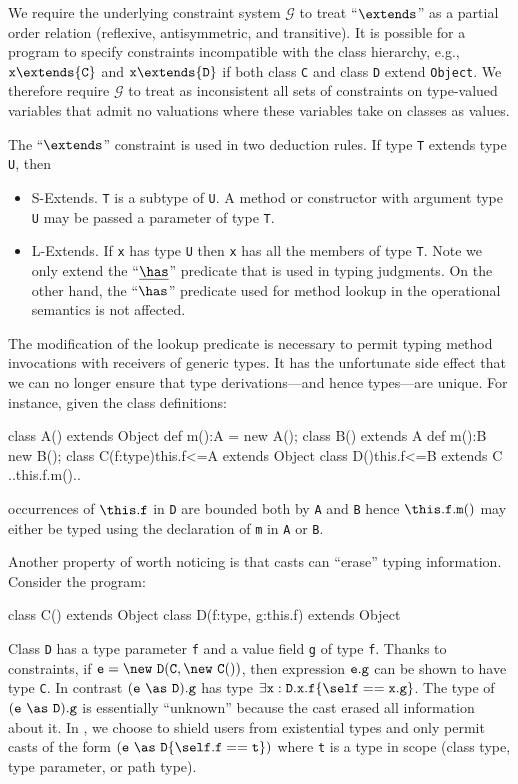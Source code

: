 We require the underlying constraint system $\mathcal{G}$ to treat ``$\extends$'' as a partial order relation (reflexive, antisymmetric, and transitive). It is possible for a program to specify constraints incompatible with the class hierarchy, e.g., ${\tt x}\extends{\tt C}$ and ${\tt x}\extends{\tt D}$ if both class {\tt C} and class {\tt D} extend {\tt Object}. We therefore require $\mathcal{G}$ to treat as inconsistent all sets of constraints on type-valued variables that admit no valuations where these variables take on classes as values.

The ``$\extends$'' constraint is used in two deduction rules. If
type {\tt T} extends type {\tt U}, then
\begin{itemize}
\item{\sc S-Extends}. {\tt T} is a subtype of {\tt U}. A method or constructor with argument type {\tt U} may be passed a parameter of type {\tt T}.
\item{\sc L-Extends}. If {\tt x} has type {\tt U} then {\tt x} has all the members of type {\tt T}. Note we only extend the ``$\underline\has$'' predicate that is used in typing judgments. On the other hand, the ``$\has$'' predicate used for method lookup in the operational semantics is not affected.
\end{itemize}

The modification of the lookup predicate is
necessary to permit typing method invocations with receivers of
generic types. It has the unfortunate side effect that we can no
longer ensure that type derivations---and hence types---are unique.
For instance, given the class definitions:
%
\begin{xten}
class A() extends Object { def m():A = new A(); }
class B() extends A { def m():B new B(); }
class C(f:type){this.f<=A} extends Object {}
class D(){this.f<=B} extends C { ..this.f.m().. }
\end{xten}
%
occurrences of $\this.{\tt f}$ in {\tt D} are bounded both by {\tt A} and {\tt B} hence 
$\this.{\tt f}.{\tt m}()$ may either be typed using the declaration of {\tt m} in {\tt A} or {\tt B}.

Another property of \FXG{} worth noticing is that casts can ``erase'' typing information.
Consider the program:
\begin{xten}
class C() extends Object {}
class D(f:type, g:this.f) extends Object {}
\end{xten}
Class {\tt D} has a type parameter {\tt f} and a value field {\tt g} of type {\tt f}.
Thanks to constraints, if
${\tt e}=\new~{\tt D}({\tt C},\new~{\tt C}())$,
then expression ${\tt e}.{\tt g}$ can be shown to
have type {\tt C}.
In contrast $({\tt e}~\as~{\tt D}).{\tt g}$ has type
$\exists {\tt x}:{\tt D}.{\tt x}.{\tt f}\{\self=={\tt x.g}\}$.
The type of $({\tt e}~\as~{\tt D}).{\tt g}$ is essentially ``unknown''
because the cast erased all information about it. In \Xten, we choose to shield users from existential types and only permit casts of the form $({\tt e}~\as~{\tt D}\{\self.{\tt f}=={\tt t}\})$ where {\tt t} is a type in scope (class type, type parameter, or path type).


